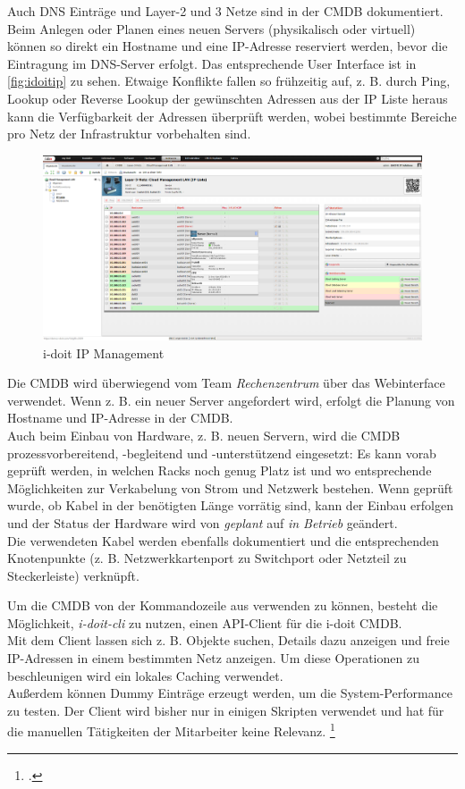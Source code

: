 Auch \acf{DNS} Einträge und Layer-2 und 3 Netze sind in der \acs{CMDB} dokumentiert. Beim Anlegen oder Planen eines neuen Servers (physikalisch oder virtuell) können so direkt ein Hostname und eine IP-Adresse reserviert werden, bevor die Eintragung im \acs{DNS}-Server erfolgt. Das entsprechende User Interface ist in \autoref{fig:idoitip} zu sehen. Etwaige Konflikte fallen so frühzeitig auf, z. B. durch Ping, Lookup oder Reverse Lookup der gewünschten Adressen aus der IP Liste heraus kann die Verfügbarkeit der Adressen überprüft werden, wobei bestimmte Bereiche pro Netz der Infrastruktur vorbehalten sind.

\begin{figure}[H]
  \centering
  \includegraphics[width=\textwidth]{Anhang/idoitip}
  \caption{i-doit IP Management}
\label{fig:idoitip}
\end{figure}

Die \acs{CMDB} wird überwiegend vom Team \textit{Rechenzentrum} über das Webinterface verwendet. Wenn z. B. ein neuer Server angefordert wird, erfolgt die Planung von Hostname und IP-Adresse in der \acs{CMDB}.\\
Auch beim Einbau von Hardware, z. B. neuen Servern, wird die \acs{CMDB} prozessvorbereitend, -begleitend und -unterstützend eingesetzt: Es kann vorab geprüft werden, in welchen Racks noch genug Platz ist und wo entsprechende Möglichkeiten zur Verkabelung von Strom und Netzwerk bestehen. Wenn geprüft wurde, ob Kabel in der benötigten Länge vorrätig sind, kann der Einbau erfolgen und der Status der Hardware wird von \textit{geplant} auf \textit{in Betrieb} geändert.\\
Die verwendeten Kabel werden ebenfalls dokumentiert und die entsprechenden Knotenpunkte (z. B. Netzwerkkartenport zu Switchport oder Netzteil zu Steckerleiste) verknüpft.

Um die \acs{CMDB} von der Kommandozeile aus verwenden zu können, besteht die Möglichkeit, \textit{i-doit-cli} zu nutzen, einen \acf{API}-Client für die i-doit \acs{CMDB}.\\
Mit dem Client lassen sich z. B. Objekte suchen, Details dazu anzeigen und freie IP-Adressen in einem bestimmten Netz anzeigen. Um diese Operationen zu beschleunigen wird ein lokales Caching verwendet.\\
Außerdem können Dummy Einträge erzeugt werden, um die System-Performance zu testen. Der Client wird bisher nur in einigen Skripten verwendet und hat für die manuellen Tätigkeiten der Mitarbeiter keine Relevanz.
\footcite[Vgl.][o. \pno]{Heisig_2019_idoitcli}

